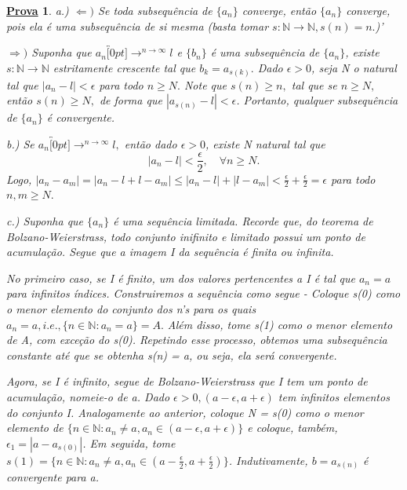 \documentclass{article}
\newtheorem*{proof*}{\underline{Prova}}
\begin{document}
 \begin{proof*}
a.) $\Leftarrow)$ Se toda subsequ\^encia de $\{a_{n}\}$ converge, ent\~ao $\{a_{n}\}$ converge, pois ela \'e uma subsequ\^encia de si mesma (basta tomar $s:\mathbb{N}\rightarrow \mathbb{N}, s(n) = n.$)'

$\Rightarrow)$ Suponha que $a_{n}\overbracket[0pt]{\longrightarrow}^{n\to \infty}l$ e $\{b_{n}\}$ \'e uma subsequ\^encia de $\{a_{n}\}$, existe 
$s:\mathbb{N}\rightarrow \mathbb{N}$ estritamente crescente tal que $b_{k} = a_{s(k)}.$ Dado $\epsilon > 0$, seja N o natural tal que
 $|a_{n} - l| < \epsilon$ para todo $n\geq{N}.$ Note que $s(n)\geq{n},$ tal que se $n\geq{N},$ ent\~ao $s(n)\geq{N},$ de forma que 
 $|a_{s(n)} - l| < \epsilon$. Portanto, qualquer subsequ\^encia de $\{a_{n}\}$ \'e convergente.

 b.) Se $a_{n}\overbracket[0pt]{\longrightarrow}^{n\to \infty}l,$ ent\~ao dado $\epsilon > 0$, existe N natural tal que 
 $$
  |a_{n}-l|<\frac{\epsilon}{2},\quad\forall n\geq{N}.
 $$
 Logo, $|a_{n}-a_{m}| = |a_{n}-l + l-a_{m}| \leq{|a_{n}-l| + |l-a_{m}|} < \frac{\epsilon}{2} + \frac{\epsilon}{2} = \epsilon$ para todo $n, m \geq{N}.$

 c.) Suponha que $\{a_{n}\}$ \'e uma sequ\^encia limitada. Recorde que, do teorema de Bolzano-Weierstrass, todo conjunto inifinito e limitado
possui um ponto de acumula\c c\~ao. Segue que a imagem I da sequ\^encia \'e finita ou infinita.

No primeiro caso, se I \'e finito, um dos valores pertencentes a I \'e tal que $a_{n} = a$ para infinitos \'indices. 
Construiremos a sequ\^encia como segue - Coloque s(0) como o menor elemento do conjunto dos n's para os quais 
$a_{n} = a, i.e.,\{n\in \mathbb{N}: a_{n} = a\} = A. $ Al\'em disso, tome s(1) como  o menor elemento de A, com  exce\c c\~ao do
s(0). Repetindo esse processo, obtemos uma subsequ\^encia constante at\'e que se obtenha s(n) = a, ou seja, ela ser\'a convergente.

Agora, se I \'e infinito, segue de Bolzano-Weierstrass que I tem um ponto de acumula\c c\~ao, nomeie-o de a. Dado $\epsilon > 0, (a-\epsilon, a+\epsilon)$ 
tem infinitos elementos do conjunto I. Analogamente ao anterior, coloque N = s(0) como o menor elemento de $\{n\in \mathbb{N}: a_{n}\neq a, a_{n}\in(a-\epsilon, a+\epsilon)\}$ e coloque, tamb\'em,
$\epsilon_{1} = |a-a_{s(0)}|$. Em seguida, tome $s(1) = \{n\in \mathbb{N}: a_{n}\neq a, a_{n}\in(a-\frac{\epsilon}{2}, a+\frac{\epsilon}{2})\}$. Indutivamente,
$b = a_{s(n)}$ \'e convergente para a.


\end{proof*}
\end{document}
